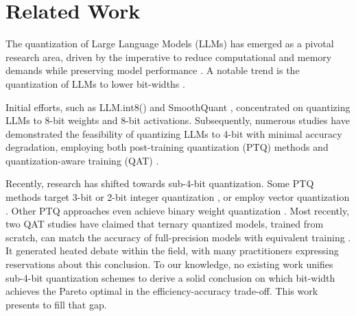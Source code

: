 \section{Related Work}
\label{sec:related_work}
The quantization of Large Language Models (LLMs) has emerged as a pivotal research area, driven by the imperative to reduce computational and memory demands while preserving model performance \citep{liu2023llmqat,dettmers2022llmint8,xiao2022smoothquant}. A notable trend is the quantization of LLMs to lower bit-widths \cite{ma2024era,kaushal2024spectra}. 

Initial efforts, such as LLM.int8() \cite{dettmers2022llmint8} and SmoothQuant \cite{xiao2022smoothquant}, concentrated on quantizing LLMs to 8-bit weights and 8-bit activations. Subsequently, numerous studies have demonstrated the feasibility of quantizing LLMs to 4-bit with minimal accuracy degradation, employing both post-training quantization (PTQ) methods \cite{kim2023squeezellm,frantar2022gptq,liu2024spinquant,liu2023llm} and quantization-aware training (QAT) \cite{liu2023llmqat,chen2024efficientqat, bondarenko2021understanding}.

Recently, research has shifted towards sub-4-bit quantization. Some PTQ methods target 3-bit or 2-bit integer quantization \cite{shao2023omniquant, zhao2023atom, chee2024quip, ashkboos2024quarot,lin2023awq,frantar2022gptq}, or employ vector quantization \cite{egiazarian2024aqlm,tseng2024quip,baalen2023gptvq}. Other PTQ approaches even achieve binary weight quantization \cite{huang2024billm,shang2023pb,chen2024db,li2024arb}. Most recently, two QAT studies have claimed that ternary quantized models, trained from scratch, can match the accuracy of full-precision models with equivalent training \cite{ma2024era,kaushal2024spectra}. It generated heated debate within the field, with many practitioners expressing reservations about this conclusion.
To our knowledge, no existing work unifies sub-4-bit quantization schemes to derive a solid conclusion on which bit-width achieves the Pareto optimal in the efficiency-accuracy trade-off. This work presents \ours{} to fill that gap.
